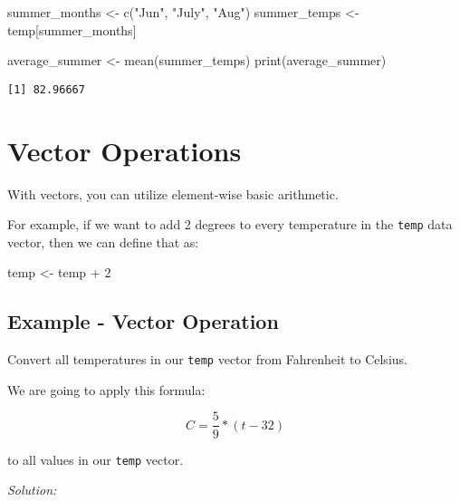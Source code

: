 \documentclass[
  letterpaper,
  DIV=11,
  numbers=noendperiod]{scrreprt}
\newenvironment{Shaded}{\begin{snugshade}}{\end{snugshade}}
\newcommand{\DecValTok}[1]{\textcolor[rgb]{0.68,0.00,0.00}{#1}}
\newcommand{\FunctionTok}[1]{\textcolor[rgb]{0.28,0.35,0.67}{#1}}
\newcommand{\NormalTok}[1]{\textcolor[rgb]{0.00,0.23,0.31}{#1}}
\newcommand{\OtherTok}[1]{\textcolor[rgb]{0.00,0.23,0.31}{#1}}
\newcommand{\SpecialCharTok}[1]{\textcolor[rgb]{0.37,0.37,0.37}{#1}}
\newcommand{\StringTok}[1]{\textcolor[rgb]{0.13,0.47,0.30}{#1}}
\begin{document}
\begin{Shaded}
\begin{Highlighting}[]
\NormalTok{summer\_months }\OtherTok{\textless{}{-}} \FunctionTok{c}\NormalTok{(}\StringTok{"Jun"}\NormalTok{, }\StringTok{"July"}\NormalTok{, }\StringTok{"Aug"}\NormalTok{)}
\NormalTok{summer\_temps }\OtherTok{\textless{}{-}}\NormalTok{ temp[summer\_months]}

\NormalTok{average\_summer }\OtherTok{\textless{}{-}} \FunctionTok{mean}\NormalTok{(summer\_temps)}
\FunctionTok{print}\NormalTok{(average\_summer)}
\end{Highlighting}
\end{Shaded}

\begin{verbatim}
[1] 82.96667
\end{verbatim}

\section*{Vector Operations}\label{vector-operations}


With vectors, you can utilize element-wise basic arithmetic.

For example, if we want to add 2 degrees to every temperature in the
\texttt{temp} data vector, then we can define that as:

\begin{Shaded}
\begin{Highlighting}[]
\NormalTok{temp }\OtherTok{\textless{}{-}}\NormalTok{ temp }\SpecialCharTok{+} \DecValTok{2}
\end{Highlighting}
\end{Shaded}

\subsection*{Example - Vector
Operation}\label{example---vector-operation}

Convert all temperatures in our \texttt{temp} vector from Fahrenheit to
Celsius.

We are going to apply this formula:

\[
C = \frac{5}{9}*(t - 32)
\]

to all values in our \texttt{temp} vector.

\emph{Solution:}
\end{document}
